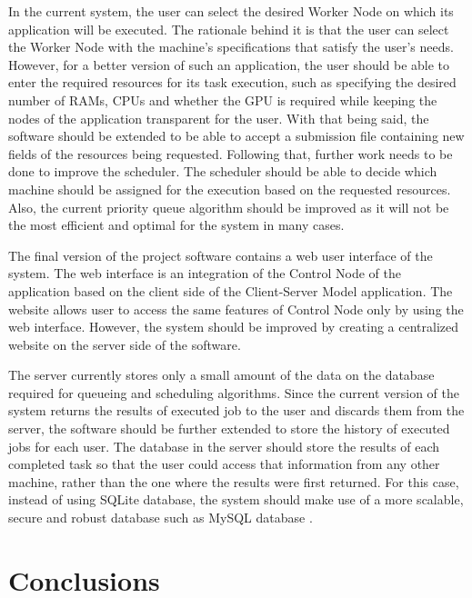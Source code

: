 \documentclass[10pt]{report}
\begin{document}
In the current system, the user can select the desired Worker Node on which its application will be executed. The rationale behind it is that the user can select the Worker Node with the machine's specifications that satisfy the user's needs. However, for a better version of such an application, the user should be able to enter the required resources for its task execution, such as specifying the desired number of RAMs, CPUs and whether the GPU is required while keeping the nodes of the application transparent for the user. With that being said, the software should be extended to be able to accept a submission file containing new fields of the resources being requested. Following that, further work needs to be done to improve the scheduler. The scheduler should be able to decide which machine should be assigned for the execution based on the requested resources. Also, the current priority queue algorithm should be improved as it will not be the most efficient and optimal for the system in many cases.
\newline

The final version of the project software contains a web user interface of the system. The web interface is an integration of the Control Node of the application based on the client side of the Client-Server Model application. The website allows user to access the same features of Control Node only by using the web interface. However, the system should be improved by creating a centralized website on the server side of the software.
\newline

The server currently stores only a small amount of the data on the database required for queueing and scheduling algorithms. Since the current version of the system returns the results of executed job to the user and discards them from the server, the software should be further extended to store the history of executed jobs for each user. The database in the server should store the results of each completed task so that the user could access that information from any other machine, rather than the one where the results were first returned. For this case, instead of using SQLite database, the system should make use of a more scalable, secure and robust database such as MySQL database \cite{sqlvsmysql}.

\section{Conclusions}
\end{document}

